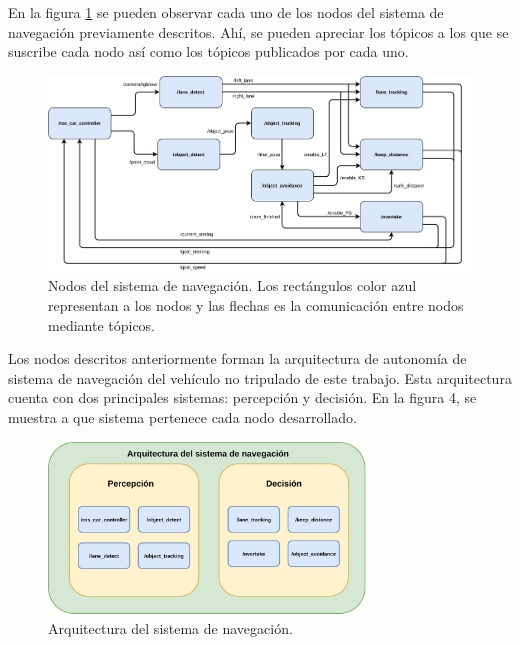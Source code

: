 En la figura \ref{fig:nodes} se pueden observar cada uno de los nodos del sistema de navegación previamente descritos. Ahí, se pueden apreciar los tópicos a los que se suscribe cada nodo así como los tópicos publicados por cada uno.
\begin{figure}[h]
    \centering
    \includegraphics[width=1.0\textwidth]{Figures/Figures_Cap07/nodes.pdf}
    \caption{Nodos del sistema de navegación. Los rectángulos color azul representan a los nodos y las flechas es la comunicación entre nodos mediante tópicos.}
    \label{fig:nodes}
\end{figure}

\newpage
Los nodos descritos anteriormente forman la arquitectura de autonomía de sistema de navegación del vehículo no tripulado de este trabajo. Esta arquitectura cuenta con dos principales sistemas: percepción y decisión. En la figura 4, se muestra a que sistema pertenece cada nodo desarrollado.
\begin{figure}[h]
    \centering
    \includegraphics[width=0.75\textwidth]{Figures/Figures_Cap07/architecture.pdf}
    \caption{Arquitectura del sistema de navegación.}
    \label{fig:architecture}
\end{figure}


